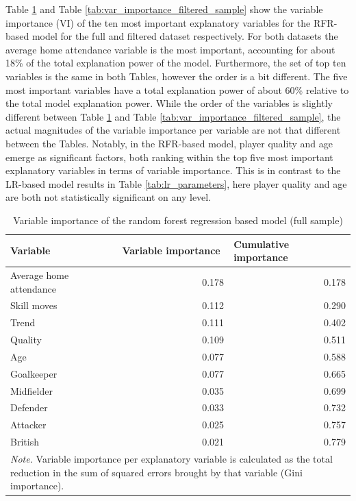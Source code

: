 \noindent
Table \ref{tab:var_importance_full_sample} and Table \ref{tab:var_importance_filtered_sample} show the variable importance (VI) of the ten most important explanatory variables for the RFR-based model for the full and filtered dataset respectively. For both datasets the average home attendance variable is the most important, accounting for about 18\% of the total explanation power of the model. Furthermore, the set of top ten variables is the same in both Tables, however the order is a bit different. The five most important variables have a total explanation power of about 60\% relative to the total model explanation power. While the order of the variables is slightly different between Table \ref{tab:var_importance_full_sample} and Table \ref{tab:var_importance_filtered_sample}, the actual magnitudes of the variable importance per variable are not that different between the Tables. Notably, in the RFR-based model, player quality and age emerge as significant factors, both ranking within the top five most important explanatory variables in terms of variable importance. This is in contrast to the LR-based model results in Table \ref{tab:lr_parameters}, here player quality and age are both not statistically significant on any level. \\

\begin{table}[htbp]
    \begin{spacing}{1.5}
    \small
    \centering
    \caption{Variable importance of the random forest regression based model (full sample)}
    \label{tab:var_importance_full_sample}
    \begin{tabular}{lrr}
        \toprule
        \toprule
        \textbf{Variable} & \multicolumn{1}{l}{\textbf{Variable importance}} & \multicolumn{1}{l}{\textbf{Cumulative importance}} \\
        \midrule
        Average home attendance & 0.178 & 0.178 \\
        Skill moves & 0.112 & 0.290 \\
        Trend & 0.111 & 0.402 \\
        Quality & 0.109 & 0.511 \\
        Age   & 0.077 & 0.588 \\
        Goalkeeper & 0.077 & 0.665 \\
        Midfielder & 0.035 & 0.699 \\
        Defender & 0.033 & 0.732 \\
        Attacker & 0.025 & 0.757 \\
        British & 0.021 & 0.779 \\
        \bottomrule
        \bottomrule
        \multicolumn{3}{p{13cm}}{\footnotesize\textit{Note.} Variable importance per explanatory variable is calculated as the total reduction in the sum of squared errors brought by that variable (Gini importance).}
    \end{tabular}
    \end{spacing}
\end{table}

